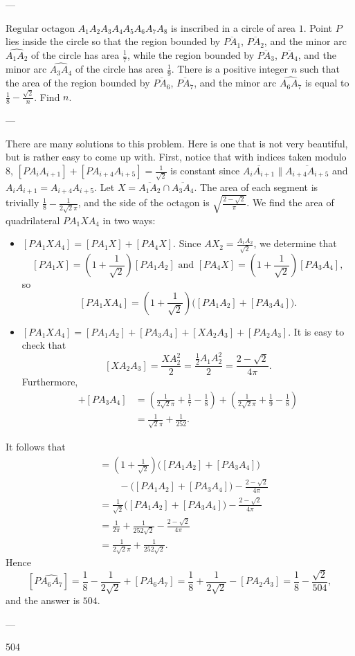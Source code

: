 
---

Regular octagon $A_1A_2A_3A_4A_5A_6A_7A_8$ is inscribed in a circle of area $1$. Point $P$ lies inside the circle so that the region bounded by $\overline{PA_1}$, $\overline{PA_2}$, and the minor arc $\widehat{A_1A_2}$ of the circle has area $\tfrac17$, while the region bounded by $\overline{PA_3}$, $\overline{PA_4}$, and the minor arc $\widehat{A_3A_4}$ of the circle has area $\tfrac 19$. There is a positive integer $n$ such that the area of the region bounded by $\overline{PA_6}$, $\overline{PA_7}$, and the minor arc $\widehat{A_6A_7}$ is equal to $\tfrac18 - \tfrac{\sqrt 2}n$. Find $n$.

---

There are many solutions to this problem. Here is one that is not very beautiful, but is rather easy to come up with. First, notice that with indices taken modulo $8$, $[PA_iA_{i+1}]+[PA_{i+4}A_{i+5}]=\tfrac1{\sqrt2}$ is constant since $\overline{A_iA_{i+1}}\parallel\overline{A_{i+4}A_{i+5}}$ and $A_iA_{i+1}=A_{i+4}A_{i+5}$. Let $X=\overline{A_1A_2}\cap\overline{A_3A_4}$. The area of each segment is trivially $\tfrac18-\tfrac1{2\sqrt2\pi}$, and the side of the octagon is $\sqrt{\tfrac{2-\sqrt2}{\pi}}$. We find the area of quadrilateral $PA_1XA_4$ in two ways:
\begin{itemize}
    \item $[PA_1XA_4]=[PA_1X]+[PA_4X]$. Since $AX_2=\tfrac{A_1A_2}{\sqrt2}$, we determine that \[[PA_1X]=\left(1+\frac1{\sqrt2}\right)[PA_1A_2]\text{ and }[PA_4X]=\left(1+\frac1{\sqrt2}\right)[PA_3A_4],\]
        so \[[PA_1XA_4]=\left(1+\frac1{\sqrt2}\right)\big([PA_1A_2]+[PA_3A_4]\big).\]
    \item $[PA_1XA_4]=[PA_1A_2]+[PA_3A_4]+[XA_2A_3]+[PA_2A_3]$. It is easy to check that \[[XA_2A_3]=\frac{XA_2^2}2=\frac{\tfrac12 A_1A_2^2}2=\frac{2-\sqrt2}{4\pi}.\]
        Furthermore,
        \begin{align*}
            [PA_1A_2]+[PA_3A_4]&=\left(\frac1{2\sqrt2\pi}+\frac17-\frac18\right)+\left(\frac1{2\sqrt2\pi}+\frac19-\frac18\right)\\
            &=\frac1{\sqrt2\pi}+\frac1{252}.
        \end{align*}
\end{itemize}
It follows that
\begin{align*}
    [PA_2A_3]&=\left(1+\frac1{\sqrt2}\right)\big([PA_1A_2]+[PA_3A_4]\big)\\
    &\qquad-\big([PA_1A_2]+[PA_3A_4]\big)-\frac{2-\sqrt2}{4\pi}\\
    &=\frac1{\sqrt2}\big([PA_1A_2]+[PA_3A_4]\big)-\frac{2-\sqrt2}{4\pi}\\
    &=\frac1{2\pi}+\frac1{252\sqrt2}-\frac{2-\sqrt2}{4\pi}\\
    &=\frac1{2\sqrt2\pi}+\frac1{252\sqrt2}.
\end{align*}
Hence \[\left[P\widehat{A_6A_7}\right]=\frac18-\frac1{2\sqrt2}+[PA_6A_7]=\frac18+\frac1{2\sqrt2}-[PA_2A_3]=\frac18-\frac{\sqrt2}{504},\]
and the answer is $\boxed{504}$.

---

504
